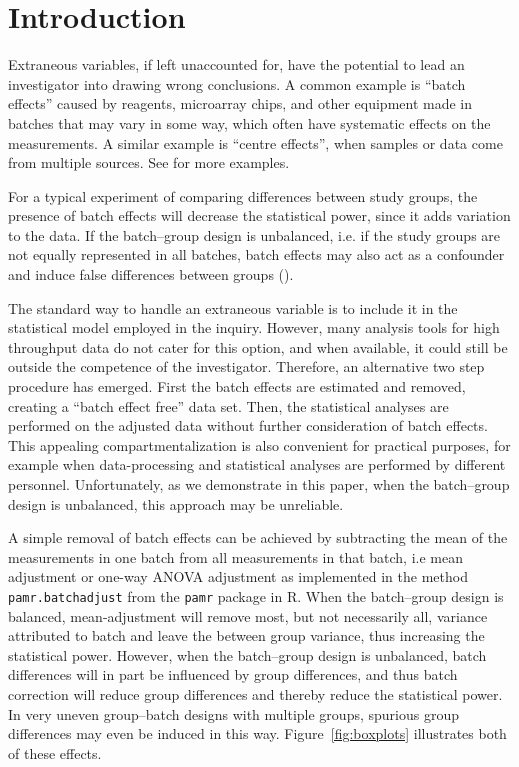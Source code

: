 \documentclass{bio}
\begin{document}
\section{Introduction}\label{intro}

Extraneous variables, if left unaccounted for, have the potential to lead an investigator into drawing wrong conclusions. A common example is ``batch effects'' caused by reagents, microarray chips, and other equipment made in batches that may vary in some way, which often have systematic effects on the measurements. A similar example is ``centre effects'', when samples or data come from multiple sources. See \citet{Luo2010} for more examples.

For a typical experiment of comparing differences between study groups, the presence of batch effects will decrease the statistical power, since it adds variation to the data. If the batch--group design is unbalanced, i.e. if the study groups are not equally represented in all batches, batch effects may also act as a confounder and induce false differences between groups (\citealp{Leek2010}).

The standard way to handle an extraneous variable is to include it in the statistical model employed in the inquiry. However, many analysis tools for high throughput data do not cater for this option, and when available, it could still be outside the competence of the investigator. Therefore, an alternative two step procedure has emerged. First the batch effects are estimated and removed, creating a ``batch effect free'' data set. Then, the statistical analyses are performed on the adjusted data without further consideration of batch effects. This appealing compartmentalization is also convenient for practical purposes, for example when data-processing and statistical analyses are performed by different personnel. Unfortunately, as we demonstrate in this paper, when the batch--group design is unbalanced, this approach may be unreliable.

A simple removal of batch effects can be achieved by subtracting the mean of the measurements in one batch from all measurements in that batch, i.e mean adjustment or one-way ANOVA adjustment as implemented in the method \texttt{pamr.batchadjust} from the \texttt{pamr} package in R. When the batch--group design is balanced, mean-adjustment will remove most, but not necessarily all, variance attributed to batch and leave the between group variance, thus increasing the statistical power. However, when the batch--group design is unbalanced, batch differences will in part be influenced by group differences, and thus batch correction will reduce group differences and thereby reduce the statistical power. In very uneven group--batch designs with multiple groups, spurious group differences may even be induced in this way. Figure~\ref{fig:boxplots} illustrates both of these effects.
\end{document}
